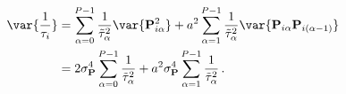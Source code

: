 %
%
% 
%
\begin{equation}
\begin{aligned}
  \var{\frac{1}{\tau_i}}
  & = \sum_{\alpha=0}^{P-1} \frac{1}{\tilde{\tau}_\alpha^2} \var{\mathbf{P}_{i \alpha}^2} + a^2 \sum_{\alpha=1}^{P-1} \frac{1}{\tilde{\tau}_\alpha^2} \var{\mathbf{P}_{i \alpha}\mathbf{P}_{i (\alpha-1)}} \\
  & = 2 \sigma_\mathbf{P}^4 \sum_{\alpha=0}^{P-1} \frac{1}{\tilde{\tau}_\alpha^2} + a^2 \sigma_\mathbf{P}^4 \sum_{\alpha=1}^{P-1} \frac{1}{\tilde{\tau}_\alpha^2} \,.
  \label{eq:variance_neuronal_inv_tau_with_moments}
\end{aligned}
\end{equation}

